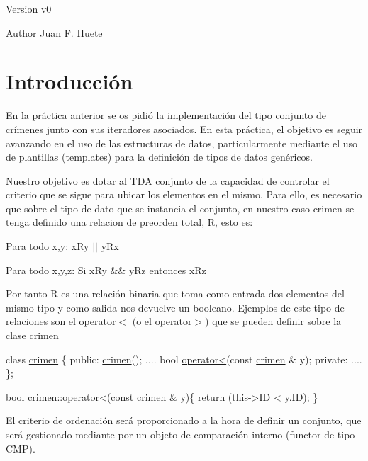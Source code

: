 \begin{DoxyVersion}{Version}
v0 
\end{DoxyVersion}
\begin{DoxyAuthor}{Author}
Juan F. Huete
\end{DoxyAuthor}
\hypertarget{index_intro_sec}{}\section{Introducción}\label{index_intro_sec}
En la práctica anterior se os pidió la implementación del tipo conjunto de crímenes junto con sus iteradores asociados. En esta práctica, el objetivo es seguir avanzando en el uso de las estructuras de datos, particularmente mediante el uso de plantillas (templates) para la definición de tipos de datos genéricos.

Nuestro objetivo es dotar al T\-D\-A conjunto de la capacidad de controlar el criterio que se sigue para ubicar los elementos en el mismo. Para ello, es necesario que sobre el tipo de dato que se instancia el conjunto, en nuestro caso crimen se tenga definido una relacion de preorden total, R, esto es\-:

\begin{DoxyItemize}
\item Para todo x,y\-: x\-Ry $\vert$$\vert$ y\-Rx \item Para todo x,y,z\-: Si x\-Ry \&\& y\-Rz entonces x\-Rz\end{DoxyItemize}
Por tanto R es una relación binaria que toma como entrada dos elementos del mismo tipo y como salida nos devuelve un booleano. Ejemplos de este tipo de relaciones son el operator$<$ (o el operator$>$) que se pueden definir sobre la clase crimen 
\begin{DoxyCode}
\textcolor{keyword}{class }\hyperlink{classcrimen}{crimen} \{
 \textcolor{keyword}{public}:
  \hyperlink{classcrimen_ab1147e36869c7e635699e4ef746a7555}{crimen}();
  ....
  \textcolor{keywordtype}{bool} \hyperlink{classcrimen_ac865fdb9712f2426d947b1b5546b50e5}{operator<}(\textcolor{keyword}{const} \hyperlink{classcrimen}{crimen} & y);
 \textcolor{keyword}{private}:
  ....
\};

\textcolor{keywordtype}{bool} \hyperlink{classcrimen_ac865fdb9712f2426d947b1b5546b50e5}{crimen::operator<}(\textcolor{keyword}{const} \hyperlink{classcrimen}{crimen} & y)\{
  \textcolor{keywordflow}{return} (this->ID < y.ID);
\}
\end{DoxyCode}


El criterio de ordenación será proporcionado a la hora de definir un conjunto, que será gestionado mediante por un objeto de comparación interno (functor de tipo C\-M\-P).


